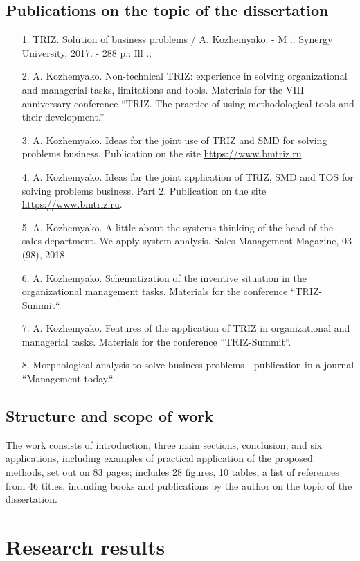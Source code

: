 \documentclass[11pt,a4paper]{book}
\begin{document}
\section{Publications on the topic of the dissertation}
\begin{itemize}
\item[1.] TRIZ. Solution of business problems / A. Kozhemyako. - M .: Synergy
  University, 2017. - 288 p.: Ill .;
\item[2.] A. Kozhemyako. Non-technical TRIZ: experience in solving
  organizational and managerial tasks, limitations and tools. Materials for
  the VIII anniversary conference “TRIZ. The practice of using methodological
  tools and their development.”
\item[3.] A. Kozhemyako. Ideas for the joint use of TRIZ and SMD for solving
  problems business. Publication on the site \url{https://www.bmtriz.ru}.
\item[4.] A. Kozhemyako. Ideas for the joint application of TRIZ, SMD and TOS
  for solving problems business.  Part 2. Publication on the site
  \url{https://www.bmtriz.ru}.
\item[5.] A. Kozhemyako. A little about the systems thinking of the head of
  the sales department.  We apply system analysis. Sales Management Magazine,
  03 (98), 2018
\item[6.] A. Kozhemyako. Schematization of the inventive situation in the
  organizational management tasks. Materials for the conference “TRIZ-Summit“.
\item[7.] A. Kozhemyako. Features of the application of TRIZ in organizational
  and managerial tasks. Materials for the conference “TRIZ-Summit“.
\item[8.] Morphological analysis to solve business problems - publication in a
  journal “Management today.“
\end{itemize}

\section{Structure and scope of work}
The work consists of introduction, three main sections, conclusion, and six
applications, including examples of practical application of the proposed
methods, set out on 83 pages; includes 28 figures, 10 tables, a list of
references from 46 titles, including books and publications by the author on
the topic of the dissertation.

\chapter{Research results}
\end{document}
